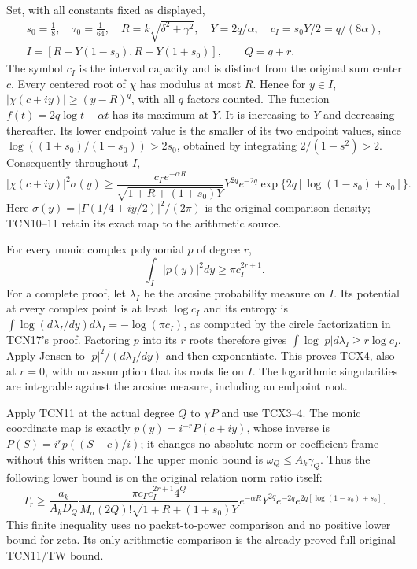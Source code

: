 \documentclass[11pt,a4paper]{article}
\begin{document}
Set, with all constants fixed as displayed,
\begin{equation}\tag{TCX2}
\begin{gathered}
 s_0=\tfrac18,\quad \tau_0=\tfrac1{64},\quad
 R=k\sqrt{\delta^2+\gamma^2},\quad Y=2q/\alpha,
 \quad c_I=s_0Y/2=q/(8\alpha),\\
 I=[R+Y(1-s_0),R+Y(1+s_0)],\qquad Q=q+r.
\end{gathered}
\end{equation}
The symbol $c_I$ is the interval capacity and is distinct from the
original sum center $c$. Every centered root of $\chi$ has modulus
at most $R$. Hence for $y\in I$,
$|\chi(c+iy)|\ge(y-R)^q$, with all $q$ factors counted.
The function $f(t)=2q\log t-\alpha t$ has its maximum at $Y$.
It is increasing to $Y$ and decreasing thereafter. Its lower endpoint
value is the smaller of its two endpoint values, since
$\log((1+s_0)/(1-s_0))>2s_0$, obtained by integrating
$2/(1-s^2)>2$. Consequently throughout $I$,
\begin{equation}\tag{TCX3}
 |\chi(c+iy)|^2\sigma(y)\ge
 \frac{c_\Gamma e^{-\alpha R}}
      {\sqrt{1+R+(1+s_0)Y}}
 Y^{2q}e^{-2q}
 \exp\{2q[\log(1-s_0)+s_0]\}.
\end{equation}
Here $\sigma(y)=|\Gamma(1/4+iy/2)|^2/(2\pi)$ is the original
comparison density; TCN10--11 retain its exact map to the arithmetic
source.

For every monic complex polynomial $p$ of degree $r$,
\begin{equation}\tag{TCX4}
 \int_I|p(y)|^2dy\ge\pi c_I^{2r+1}.
\end{equation}
For a complete proof, let $\lambda_I$ be the arcsine probability
measure on $I$. Its potential at every complex point is at least
$\log c_I$ and its entropy is
$\int\log(d\lambda_I/dy)d\lambda_I=-\log(\pi c_I)$,
as computed by the circle factorization in TCN17's proof.
Factoring $p$ into its $r$ roots therefore gives
$\int\log|p|d\lambda_I\ge r\log c_I$. Apply Jensen to
$|p|^2/(d\lambda_I/dy)$ and then exponentiate. This proves TCX4,
also at $r=0$, with no assumption that its roots lie on $I$.
The logarithmic singularities are integrable against the arcsine
measure, including an endpoint root.

Apply TCN11 at the actual degree $Q$ to $\chi P$ and use TCX3--4.
The monic coordinate map is exactly
$p(y)=i^{-r}P(c+iy)$, whose inverse is
$P(S)=i^rp((S-c)/i)$; it changes no absolute norm or coefficient
frame without this written map. The upper monic bound is
$\omega_Q\le A_k\gamma_Q$. Thus the following lower bound is on
the original relation norm ratio itself:
\begin{equation}\tag{TCX5}
 T_r\ge
 \frac{a_k}{A_kD_Q}
 \frac{\pi c_\Gamma c_I^{2r+1}4^Q}
      {M_\sigma(2Q)!\sqrt{1+R+(1+s_0)Y}}
 e^{-\alpha R}Y^{2q}e^{-2q}
 e^{2q[\log(1-s_0)+s_0]}.
\end{equation}
This finite inequality uses no packet-to-power comparison and no
positive lower bound for zeta. Its only arithmetic comparison is the
already proved full original TCN11/TW bound.
\end{document}
